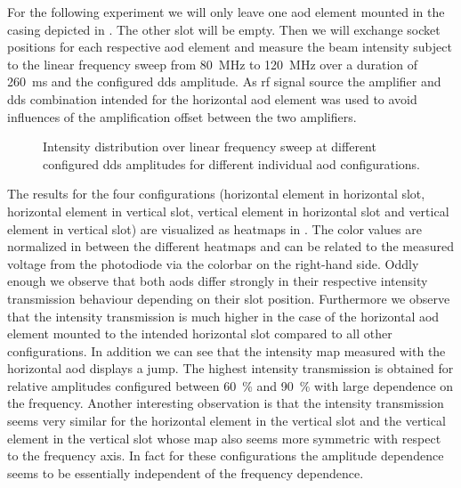 For the following experiment we will only leave one \gls{aod} element mounted
in the casing depicted in . The other slot will be empty.
Then we will exchange socket positions for each respective \gls{aod} element
and measure the beam intensity subject to the linear frequency sweep from
\SI{80}{\mega\hertz} to \SI{120}{\mega\hertz} over a duration of
\SI{260}{\milli\second} and the configured \gls{dds} amplitude. As \gls{rf}
signal source the amplifier and \gls{dds} combination intended for the
horizontal \gls{aod} element was used to avoid influences of the amplification
offset between the two amplifiers.
\begin{figure}[htb]
  \centering
  \begin{adjustbox}{width=\textwidth}
  \end{adjustbox}
  \caption{Intensity distribution over linear frequency sweep at different
    configured \gls{dds} amplitudes for different individual \gls{aod}
    configurations.
  }\label{fig:intensity_distribution_unpaired}
\end{figure}
The results for the four configurations (horizontal element in horizontal
slot, horizontal element in vertical slot, vertical element in horizontal
slot and vertical element in vertical slot) are visualized as heatmaps in
. The color values are normalized in
between the different heatmaps and can be related to the measured voltage from
the photodiode via the colorbar on the right-hand side. Oddly enough we
observe that both \gls{aod}s differ strongly in their respective intensity
transmission behaviour depending on their slot position. Furthermore we
observe that the intensity transmission is much higher in the case of the
horizontal \gls{aod} element mounted to the intended horizontal slot compared
to all other configurations. In addition we can see that the intensity map
measured with the horizontal \gls{aod} displays a jump. The highest intensity
transmission is obtained for relative amplitudes configured between
\SI{60}{\percent} and \SI{90}{\percent} with large dependence on the
frequency. Another interesting observation is that the intensity transmission
seems very similar for the horizontal element in the vertical slot and the
vertical element in the vertical slot whose map also seems more symmetric with
respect to the frequency axis. In fact for these configurations the amplitude
dependence seems to be essentially independent of the frequency dependence.
